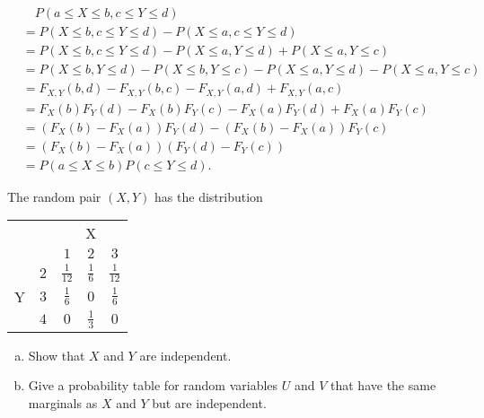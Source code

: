 \documentclass[14pt]{elegantbook}
\begin{document}
    \begin{solution}
        \begin{align*}
            &\quad P(a\leq X\leq b, c\leq Y\leq d)\\
            &=P(X\leq b, c\leq Y\leq d)-P(X\leq a, c\leq Y\leq d)\\
            &=P(X\leq b, c\leq Y\leq d)-P(X\leq a, Y\leq d)+P(X\leq a, Y\leq c)\\
            &=P(X\leq b, Y\leq d)-P(X\leq b, Y\leq c)-P(X\leq a, Y\leq d)-P(X\leq a, Y\leq c)\\
            &=F_{X,Y}(b,d)-F_{X,Y}(b,c)-F_{X,Y}(a,d)+F_{X,Y}(a,c)\\
            &=F_X(b)F_Y(d)-F_X(b)F_Y(c)-F_X(a)F_Y(d)+F_X(a)F_Y(c)\\
            &=(F_X(b)-F_X(a))F_Y(d)-(F_X(b)-F_X(a))F_Y(c)\\
            &=(F_X(b)-F_X(a))(F_Y(d)-F_Y(c))\\
            &=P(a\leq X\leq b)P(c\leq Y\leq d).
        \end{align*}
    \end{solution}

    \begin{exercise}
        The random pair $(X, Y)$ has the distribution
\begin{longtable}[c]{cc|ccc}
    \hline
    \multicolumn{2}{c|}{\multirow{2}{*}{}} & \multicolumn{3}{c}{X}                  \\ \cline{3-5} 
    \multicolumn{2}{c|}{}                  & $1$ & $2$                              & $3$ \\ \hline
    \endfirsthead
    \endhead
    \multicolumn{1}{c|}{\multirow{3}{*}{Y}} & $2$ & $\frac{1}{12}$ & $\frac{1}{6}$ & $\frac{1}{12}$ \\
    \multicolumn{1}{c|}{}                   & $3$ & $\frac{1}{6} $ & $0$                             & $\frac{1}{6}$  \\
    \multicolumn{1}{c|}{}        & $4$       & $0$ & $\frac{1}{3}$ & $0$ \\ \hline
    \end{longtable}
    \begin{enumerate}[(a)]
        \vspace{-20pt}\item Show that $X$ and $Y$ are independent.
        \item Give a probability table for random variables $U$ and $V$ that have the same marginals as $X$ and $Y$ but are independent. 
    \end{enumerate}
    \end{exercise}
\end{document}
